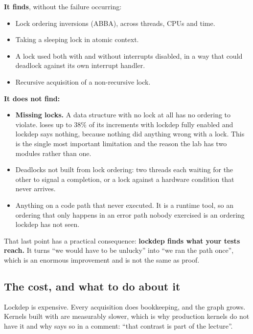 \textbf{It finds}, without the failure occurring:
\begin{itemize}
  \item Lock ordering inversions (ABBA), across threads, CPUs and time.
  \item Taking a sleeping lock in atomic context.
  \item A lock used both with and without interrupts disabled, in a way that could deadlock against
    its own interrupt handler.
  \item Recursive acquisition of a non-recursive lock.
\end{itemize}
\textbf{It does not find:}
\begin{itemize}
  \item \textbf{Missing locks.} A data structure with no lock at all has no ordering to violate.
     loses up to 38\% of its increments with lockdep fully enabled and lockdep says
    nothing, because nothing did anything wrong with a lock. This is the single most important
    limitation and the reason the lab has two modules rather than one.
  \item Deadlocks not built from lock ordering: two threads each waiting for the other to signal a
    completion, or a lock against a hardware condition that never arrives.
  \item Anything on a code path that never executed. It is a runtime tool, so an ordering that only
    happens in an error path nobody exercised is an ordering lockdep has not seen.
\end{itemize}
That last point has a practical consequence: \textbf{lockdep finds what your tests reach.} It turns
``we would have to be unlucky'' into ``we ran the path once'', which is an enormous improvement and
is not the same as proof.

\subsection{The cost, and what to do about it}
\label{c7:app:b6}

Lockdep is expensive. Every acquisition does bookkeeping, and the graph grows. Kernels built with
 are measurably slower, which is why production kernels do not have it
and why  says so in a comment: ``that contrast is part of the lecture''.

